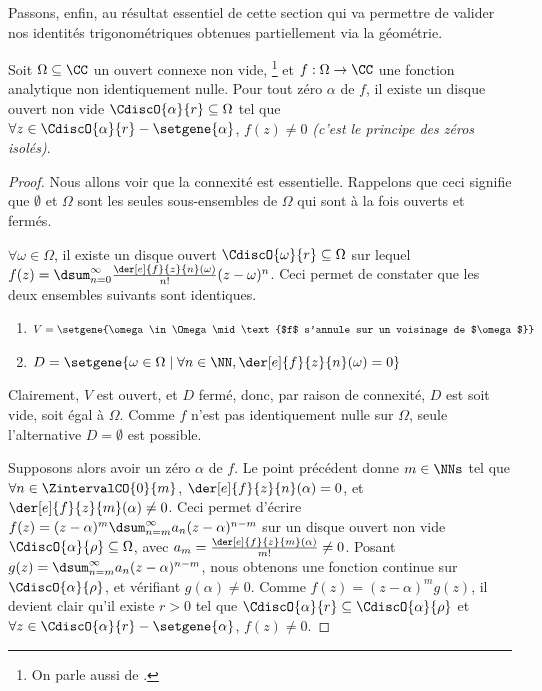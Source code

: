 

Passons, enfin, au résultat essentiel de cette section qui va permettre de valider nos identités trigonométriques obtenues partiellement via la géométrie.


\begin{fact} \label{isolated-zero}
    Soit $\Omega \subseteq \CC$ un ouvert connexe non vide,%
    \footnote{
    	On parle aussi de .
    }
    et
    $f: \Omega \rightarrow \CC$ une fonction analytique non identiquement nulle.
	Pour tout zéro $\alpha$ de $f$, il existe un disque ouvert non vide $\CdiscO{\alpha}{r} \subseteq \Omega$ tel que 
	$\forall z \in \CdiscO{\alpha}{r} - \setgene{\alpha}$, $f(z) \neq 0$
	\emph{(c'est le principe des zéros isolés)}.  
\end{fact}


\begin{proof}
	Nous allons voir que la connexité est essentielle. Rappelons que ceci signifie que $\emptyset$ et $\Omega$ sont les seules sous-ensembles de $\Omega$ qui sont à la fois ouverts et fermés.
	
	\smallskip
	
	$\forall \omega \in \Omega$, il existe un disque ouvert $\CdiscO{\omega}{r} \subseteq \Omega$ sur lequel 
	$f(z) = \dsum_{n = 0}^{\infty} \frac{\der[e]{f}{z}{n}(\omega)}{n!} (z - \omega)^n$.
	Ceci permet de constater que les deux ensembles suivants sont identiques.
	\begin{enumerate}
		\item $V = \setgene{\omega \in \Omega \mid \text{$f$ s'annule sur un voisinage de $\omega$}}$

		\item $D = \setgene{\omega \in \Omega \mid \forall n \in \NN, \der[e]{f}{z}{n}(\omega) = 0}$
	\end{enumerate}
		
	Clairement,
	$V$ est ouvert, et $D$ fermé, donc, par raison de connexité, $D$ est soit vide, soit égal à $\Omega$.
	Comme $f$ n'est pas identiquement nulle sur $\Omega$, seule l'alternative $D = \emptyset$ est possible.

	\smallskip
	
	Supposons alors avoir un zéro $\alpha$ de $f$. Le point précédent donne $m \in \NNs$ tel que 
	$\forall n \in \ZintervalCO{0}{m}$, $\der[e]{f}{z}{n}(\alpha) = 0$,
	et
	$\der[e]{f}{z}{m}(\alpha) \neq 0$.
	Ceci permet d'écrire
	$f(z) = (z - \alpha)^m \dsum_{n = m}^{\infty} a_n (z - \alpha)^{n - m}$
	sur un disque ouvert non vide $\CdiscO{\alpha}{\rho} \subseteq \Omega$,
	avec $a_m = \frac{\der[e]{f}{z}{m}(\alpha)}{m!} \neq 0$.
	Posant $g(z) = \dsum_{n = m}^{\infty} a_n (z - \alpha)^{n - m}$, nous obtenons une fonction continue sur $\CdiscO{\alpha}{\rho}$, et vérifiant $g(\alpha) \neq 0$.
	Comme $f(z) = (z - \alpha)^m g(z)$, il devient clair qu'il existe $r > 0$ tel que
	$\CdiscO{\alpha}{r} \subseteq \CdiscO{\alpha}{\rho}$
	et
	$\forall z \in \CdiscO{\alpha}{r} - \setgene{\alpha}$, $f(z) \neq 0$.
\end{proof}


